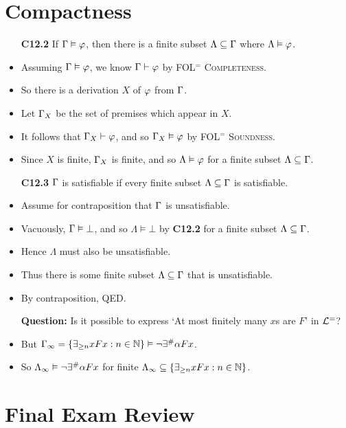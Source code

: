 \documentclass[a4paper, 11pt]{article} %
\begin{document}
\section*{Compactness}

\begin{itemize}
  \item[\bf C12.2] If $\Gamma\vDash\varphi$, then there is a finite subset $\Lambda\subseteq\Gamma$ where $\Lambda\vDash\varphi$.
    \item Assuming $\Gamma\vDash\varphi$, we know $\Gamma\vdash\varphi$ by \textsc{FOL$^=$ Completeness}.
    \item So there is a derivation $X$ of $\varphi$ from $\Gamma$.
    \item Let $\Gamma_X$ be the set of premises which appear in $X$.
    \item It follows that $\Gamma_X\vdash\varphi$, and so $\Gamma_X\vDash\varphi$ by \textsc{FOL$^=$ Soundness}.
    \item Since $X$ is finite, $\Gamma_X$ is finite, and so $\Lambda\vDash\varphi$ for a finite subset $\Lambda\subseteq\Gamma$.
  \item[\bf C12.3] $\Gamma$ is satisfiable if every finite subset $\Lambda\subseteq\Gamma$ is satisfiable.
    \item Assume for contraposition that $\Gamma$ is unsatisfiable. 
    \item Vacuously, $\Gamma\vDash\bot$, and so $\Lambda\vDash\bot$ by \textbf{C12.2} for a finite subset $\Lambda\subseteq\Gamma$.
    \item Hence $\Lambda$ must also be unsatisfiable.
    \item Thus there is some finite subset $\Lambda\subseteq\Gamma$ that is unsatisfiable. 
    \item By contraposition, QED.
  \item[\bf Question:] Is it possible to express `At most finitely many $x$s are $F$' in $\mathcal{L}^=$? 
    \item But $\Gamma_\infty=\lbrace\exists_{\geq n}xFx:n\in\mathbb{N}\rbrace \vDash \neg \exists^\# \alpha Fx$.
    \item So $\Lambda_\infty \vDash \neg \exists^\# \alpha Fx$ for finite $\Lambda_\infty \subseteq \lbrace\exists_{\geq n}xFx:n\in\mathbb{N}\rbrace$.
\end{itemize}




\section*{Final Exam Review}
\end{document}
